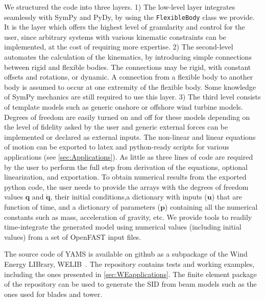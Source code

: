 \documentclass[wes, manuscript]{copernicus}
\renewcommand{\v}[1]{\boldsymbol{#1}}
\begin{document}
We structured the code into three layers. 1) The low-level layer integrates seamlessly with SymPy and PyDy, by using the \texttt{FlexibleBody} class we provide. It is the layer which offers the highest level of granularity and control for the user, since arbitrary systems with various kinematic constraints can be implemented, at the cost of requiring more expertise. 2) The second-level automates the calculation of the kinematics, by introducing simple connections between rigid and flexible bodies. The connections may be rigid, with constant offsets and rotations, or dynamic. A connection from a flexible body to another body is assumed to occur at one extremity of the flexible body. Some knowledge of SymPy mechanics are still required to use this layer.
3) The third level consists of template models such as generic onshore or offshore wind turbine models. Degrees of freedom are easily turned on and off for these models depending on the level of fidelity asked by the user and generic external forces can be implemented or declared as external inputs. The non-linear and linear equations of motion can be exported to latex and python-ready scripts for various applications (see \autoref{sec:Applications}). As little as three lines of code are required by the user to perform the full step from derivation of the equations, optional linearization, and exportation.
To obtain numerical results from the exported python code, the user needs to provide the arrays with the degrees of freedom values $\v{q}$ and $\v{\dot{q}}$, their initial conditions,a dictionary with inputs ($\v{u}$) that are function of time, and a dictionary of parameters ($\v{p}$) containing all the numerical constants such as mass, acceleration of gravity, etc. We provide tools to readily time-integrate the generated model using numerical values (including initial values) from a set of OpenFAST input files.

The source code of YAMS is available on github as a subpackage of the Wind Energy LIBrary, WELIB~\citep{WELIBgithub}. The repository contains tests and working examples, including the ones presented in \autoref{sec:WEapplications}. The finite element package of the repository can be used to generate the SID from beam models such as the ones used for blades and tower.


\end{document}
